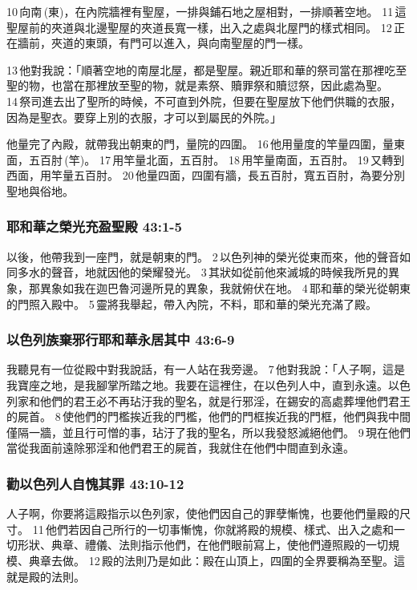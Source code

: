 10 向南 (東)，在內院牆裡有聖屋，一排與鋪石地之屋相對，一排順著空地。 11 這聖屋前的夾道與北邊聖屋的夾道長寬一樣，出入之處與北屋門的樣式相同。 12 正在牆前，夾道的東頭，有門可以進入，與向南聖屋的門一樣。

13 他對我說：「順著空地的南屋北屋，都是聖屋。親近耶和華的祭司當在那裡吃至聖的物，也當在那裡放至聖的物，就是素祭、贖罪祭和贖愆祭，因此處為聖。 14 祭司進去出了聖所的時候，不可直到外院，但要在聖屋放下他們供職的衣服，因為是聖衣。要穿上別的衣服，才可以到屬民的外院。」


他量完了內殿，就帶我出朝東的門，量院的四圍。 16 他用量度的竿量四圍，量東面，五百肘 (竿)。 17 用竿量北面，五百肘。 18 用竿量南面，五百肘。 19 又轉到西面，用竿量五百肘。 20 他量四面，四圍有牆，長五百肘，寬五百肘，為要分別聖地與俗地。

\subsubsection{耶和華之榮光充盈聖殿 43:1-5}
以後，他帶我到一座門，就是朝東的門。 2 以色列神的榮光從東而來，他的聲音如同多水的聲音，地就因他的榮耀發光。 3 其狀如從前他來滅城的時候我所見的異象，那異象如我在迦巴魯河邊所見的異象，我就俯伏在地。 4 耶和華的榮光從朝東的門照入殿中。 5 靈將我舉起，帶入內院，不料，耶和華的榮光充滿了殿。

\subsubsection{以色列族棄邪行耶和華永居其中 43:6-9}
我聽見有一位從殿中對我說話，有一人站在我旁邊。 7 他對我說：「人子啊，這是我寶座之地，是我腳掌所踏之地。我要在這裡住，在以色列人中，直到永遠。以色列家和他們的君王必不再玷汙我的聖名，就是行邪淫，在錫安的高處葬埋他們君王的屍首。 8 使他們的門檻挨近我的門檻，他們的門框挨近我的門框，他們與我中間僅隔一牆，並且行可憎的事，玷汙了我的聖名，所以我發怒滅絕他們。 9 現在他們當從我面前遠除邪淫和他們君王的屍首，我就住在他們中間直到永遠。


\subsubsection{勸以色列人自愧其罪 43:10-12}
人子啊，你要將這殿指示以色列家，使他們因自己的罪孽慚愧，也要他們量殿的尺寸。 11 他們若因自己所行的一切事慚愧，你就將殿的規模、樣式、出入之處和一切形狀、典章、禮儀、法則指示他們，在他們眼前寫上，使他們遵照殿的一切規模、典章去做。 12 殿的法則乃是如此：殿在山頂上，四圍的全界要稱為至聖。這就是殿的法則。

